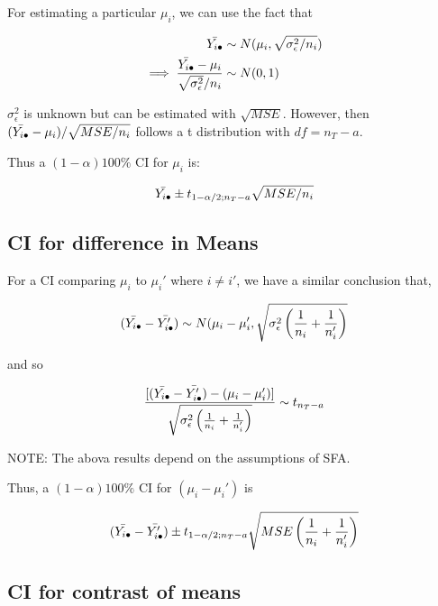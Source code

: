 \documentclass[10pt]{article}
\newcommand{\mean}[1]{\mu_{#1}}
\newcommand{\sigvar}[1]{\sigma^2_{#1}} %
\begin{document}
\begin{multicols}{3}
    For estimating a particular $\mean{i}$, we can use the fact that 

    \begin{align}
        \bar{Y_{i\bul}} & \sim N(\mean{i}, \sqrt{\sigvar{\epsilon}/n_i}) \\
        \implies \frac{\bar{Y_{i\bul}} - \mean{i}}{\sqrt{\sigvar{\epsilon}}/n_i} & \sim N(0,1)
    \end{align}

    $\sigvar{\epsilon}$ is unknown but can be estimated with $\sqrt{MSE}$. However, then $(\bar{Y_{i\bul}} - \mean{i})/\sqrt{MSE/n_i}$ follows a t distribution with $df = n_T - a$.

    Thus a $(1-\alpha) 100\%$ CI for $\mean{i}$ is:

    \begin{equation}
        \bar{Y_{i\bullet}} \pm t_{1 - \alpha/2; n_T - a} \sqrt{MSE/n_i}
    \end{equation}

    \subsection{CI for difference in Means}

    For a CI comparing $\mean{i}$ to $\mean{i}'$ where $i \ne i'$, we have a similar conclusion that,

    \begin{equation}
        (\bar{Y_{i\bul}} - \bar{Y_{i\bul}'}) \sim N(\mean{i} - \mean{i}', \sqrt{\sigvar{\epsilon} \left(\frac{1}{n_i} + \frac{1}{n_i'}\right)}
    \end{equation}

    and so 

    \begin{equation}
        \frac{[(\bar{Y_{i\bul}} - \bar{Y_{i\bul}'}) - (\mean{i} - \mean{i}')]}{\sqrt{\sigvar{\epsilon}\left(\frac{1}{n_i} + \frac{1}{n_i'}\right)}} \sim t_{n_T - a}
    \end{equation}

    NOTE: The abova results depend on the assumptions of SFA.

    Thus, a $(1-\alpha)100\%$ CI for $(\mean{i} - \mean{i}')$ is 

    \begin{equation}
        (\bar{Y_{i\bullet}} - \bar{Y_{i\bullet}'}) \pm t_{1-\alpha/2; n_T - a} \sqrt{MSE\left(\frac{1}{n_i} + \frac{1}{n_i'}\right)}
    \end{equation}

    \subsection{CI for contrast of means}


\end{multicols}
\end{document}
